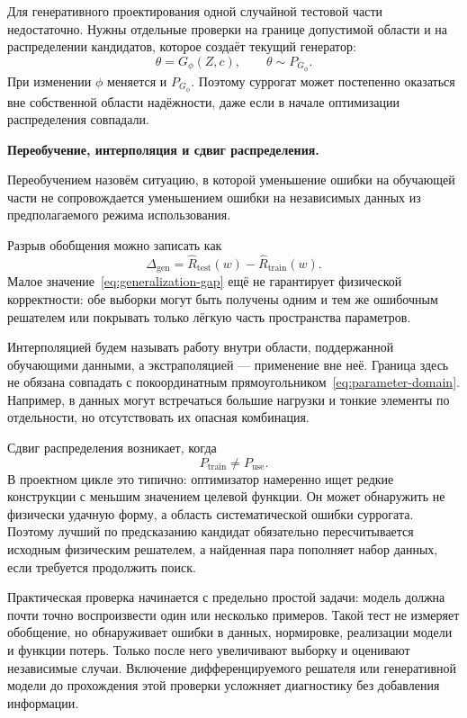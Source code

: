 Для генеративного проектирования одной случайной тестовой части недостаточно. Нужны отдельные проверки на границе допустимой области и на распределении кандидатов, которое создаёт текущий генератор:
\begin{equation}
 \theta=G_\phi(Z,c),
 \qquad
 \theta\sim P_{G_\phi}.
\end{equation}
При изменении $\phi$ меняется и $P_{G_\phi}$. Поэтому суррогат может постепенно оказаться вне собственной области надёжности, даже если в начале оптимизации распределения совпадали.

\medskip
\noindent\textbf{Переобучение, интерполяция и сдвиг распределения.}
\begin{definition}
Переобучением назовём ситуацию, в которой уменьшение ошибки на обучающей части не сопровождается уменьшением ошибки на независимых данных из предполагаемого режима использования.
\end{definition}

Разрыв обобщения можно записать как
\begin{equation}
\label{eq:generalization-gap}
 \Delta_{\mathrm{gen}}
 =
 \widehat R_{\mathrm{test}}(w)
 -
 \widehat R_{\mathrm{train}}(w).
\end{equation}
Малое значение~\eqref{eq:generalization-gap} ещё не гарантирует физической корректности: обе выборки могут быть получены одним и тем же ошибочным решателем или покрывать только лёгкую часть пространства параметров.

Интерполяцией будем называть работу внутри области, поддержанной обучающими данными, а экстраполяцией --- применение вне неё. Граница здесь не обязана совпадать с покоординатным прямоугольником~\eqref{eq:parameter-domain}. Например, в данных могут встречаться большие нагрузки и тонкие элементы по отдельности, но отсутствовать их опасная комбинация.

Сдвиг распределения возникает, когда
\begin{equation}
 P_{\mathrm{train}}\neq P_{\mathrm{use}}.
\end{equation}
В проектном цикле это типично: оптимизатор намеренно ищет редкие конструкции с меньшим значением целевой функции. Он может обнаружить не физически удачную форму, а область систематической ошибки суррогата. Поэтому лучший по предсказанию кандидат обязательно пересчитывается исходным физическим решателем, а найденная пара пополняет набор данных, если требуется продолжить поиск.

Практическая проверка начинается с предельно простой задачи: модель должна почти точно воспроизвести один или несколько примеров. Такой тест не измеряет обобщение, но обнаруживает ошибки в данных, нормировке, реализации модели и функции потерь. Только после него увеличивают выборку и оценивают независимые случаи. Включение дифференцируемого решателя или генеративной модели до прохождения этой проверки усложняет диагностику без добавления информации.

